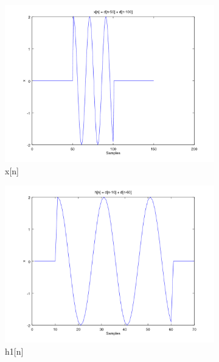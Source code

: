 \documentclass{article}
\begin{document}
\begin{figure}[H]
  \centering
  \begin{subfigure}{.52\textwidth}
    \centering
    \includegraphics[width=\textwidth]{plot2b1.png}
    \caption{x[n]}
    \label{fig:2b1}
  \end{subfigure}
  \begin{subfigure}{.49\textwidth}
    \centering
    \includegraphics[width=\textwidth]{plot2b2.png}
    \caption{h1[n]}
    \label{fig:2b2}
  \end{subfigure}
  \begin{subfigure}{.49\textwidth}
    \centering

\end{subfigure}
\end{figure}
\end{document}
